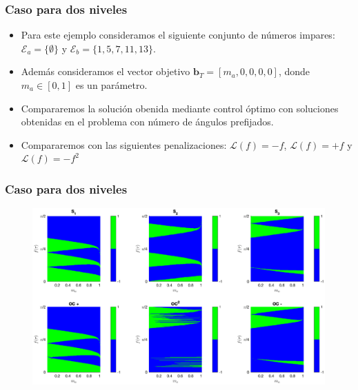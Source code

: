 \begin{frame}
    \frametitle{Caso para dos niveles}
    \begin{itemize}
        \item Para este ejemplo consideramos el siguiente conjunto de números impares: $\mathcal{E}_a = \{\emptyset\}$ y $\mathcal{E}_b = \{1,5,7,11,13\}$.
        \item Además consideramos el vector objetivo $\bm{b}_T = [m_a,0,0,0,0]$, donde  $m_a \in [0,1]$ es un parámetro.
        \item Compararemos la solución obenida mediante control óptimo con soluciones obtenidas en el problema con número de ángulos prefijados.
        \item Compararemos con las siguientes  penalizaciones: $\mathcal{L}(f) = -f$, $\mathcal{L}(f) = +f$ y $\mathcal{L}(f) = -f^2$
    \end{itemize}
\end{frame}

\begin{frame}
    \frametitle{Caso para dos niveles}
    \begin{figure}
        \centering
        \includegraphics[scale=0.35]{../D0002-FullReport/img/EX01_surf.eps}
    \end{figure}
    
\end{frame}

